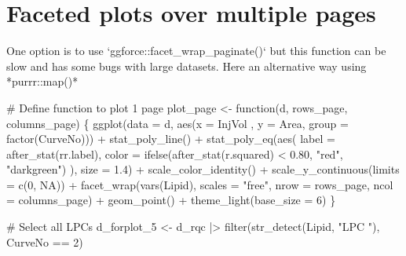 \documentclass[
  letterpaper,
  DIV=11,
  numbers=noendperiod]{scrreprt}
\newenvironment{Shaded}{\begin{snugshade}}{\end{snugshade}}
\newcommand{\AttributeTok}[1]{\textcolor[rgb]{0.40,0.45,0.13}{#1}}
\newcommand{\CommentTok}[1]{\textcolor[rgb]{0.37,0.37,0.37}{#1}}
\newcommand{\ConstantTok}[1]{\textcolor[rgb]{0.56,0.35,0.01}{#1}}
\newcommand{\ControlFlowTok}[1]{\textcolor[rgb]{0.00,0.23,0.31}{#1}}
\newcommand{\DecValTok}[1]{\textcolor[rgb]{0.68,0.00,0.00}{#1}}
\newcommand{\FloatTok}[1]{\textcolor[rgb]{0.68,0.00,0.00}{#1}}
\newcommand{\FunctionTok}[1]{\textcolor[rgb]{0.28,0.35,0.67}{#1}}
\newcommand{\NormalTok}[1]{\textcolor[rgb]{0.00,0.23,0.31}{#1}}
\newcommand{\OtherTok}[1]{\textcolor[rgb]{0.00,0.23,0.31}{#1}}
\newcommand{\SpecialCharTok}[1]{\textcolor[rgb]{0.37,0.37,0.37}{#1}}
\newcommand{\StringTok}[1]{\textcolor[rgb]{0.13,0.47,0.30}{#1}}
\begin{document}
\hypertarget{faceted-plots-over-multiple-pages}{%
\section{Faceted plots over multiple
pages}\label{faceted-plots-over-multiple-pages}}

One option is to use `ggforce::facet\_wrap\_paginate()` but this
function can be slow and has some bugs with large datasets. Here an
alternative way using *purrr::map()*

\begin{Shaded}
\begin{Highlighting}[]
\CommentTok{\# Define function to plot 1 page}
\NormalTok{plot\_page }\OtherTok{\textless{}{-}}
  \ControlFlowTok{function}\NormalTok{(d, rows\_page, columns\_page) \{}
    \FunctionTok{ggplot}\NormalTok{(}\AttributeTok{data =}\NormalTok{ d, }\FunctionTok{aes}\NormalTok{(}\AttributeTok{x =}\NormalTok{ InjVol , }\AttributeTok{y =}\NormalTok{ Area, }\AttributeTok{group =} \FunctionTok{factor}\NormalTok{(CurveNo))) }\SpecialCharTok{+}
      \FunctionTok{stat\_poly\_line}\NormalTok{() }\SpecialCharTok{+}
      \FunctionTok{stat\_poly\_eq}\NormalTok{(}\FunctionTok{aes}\NormalTok{(}
        \AttributeTok{label =} \FunctionTok{after\_stat}\NormalTok{(rr.label),}
        \AttributeTok{color =} \FunctionTok{ifelse}\NormalTok{(}\FunctionTok{after\_stat}\NormalTok{(r.squared) }\SpecialCharTok{\textless{}} \FloatTok{0.80}\NormalTok{, }\StringTok{"red"}\NormalTok{, }\StringTok{"darkgreen"}\NormalTok{)}
\NormalTok{      ), }\AttributeTok{size =} \FloatTok{1.4}\NormalTok{) }\SpecialCharTok{+}
      \FunctionTok{scale\_color\_identity}\NormalTok{() }\SpecialCharTok{+}
      \FunctionTok{scale\_y\_continuous}\NormalTok{(}\AttributeTok{limits =} \FunctionTok{c}\NormalTok{(}\DecValTok{0}\NormalTok{, }\ConstantTok{NA}\NormalTok{)) }\SpecialCharTok{+}
      \FunctionTok{facet\_wrap}\NormalTok{(}\FunctionTok{vars}\NormalTok{(Lipid),}
      \AttributeTok{scales =} \StringTok{"free"}\NormalTok{,}
      \AttributeTok{nrow =}\NormalTok{ rows\_page,}
      \AttributeTok{ncol =}\NormalTok{ columns\_page) }\SpecialCharTok{+}
      \FunctionTok{geom\_point}\NormalTok{() }\SpecialCharTok{+} \FunctionTok{theme\_light}\NormalTok{(}\AttributeTok{base\_size =} \DecValTok{6}\NormalTok{)}
\NormalTok{  \}}

\CommentTok{\# Select all LPCs}
\NormalTok{d\_forplot\_5 }\OtherTok{\textless{}{-}}\NormalTok{ d\_rqc  }\SpecialCharTok{|\textgreater{}} \FunctionTok{filter}\NormalTok{(}\FunctionTok{str\_detect}\NormalTok{(Lipid, }\StringTok{"LPC "}\NormalTok{), CurveNo }\SpecialCharTok{==} \DecValTok{2}\NormalTok{)}


\end{Highlighting}
\end{Shaded}
\end{document}
